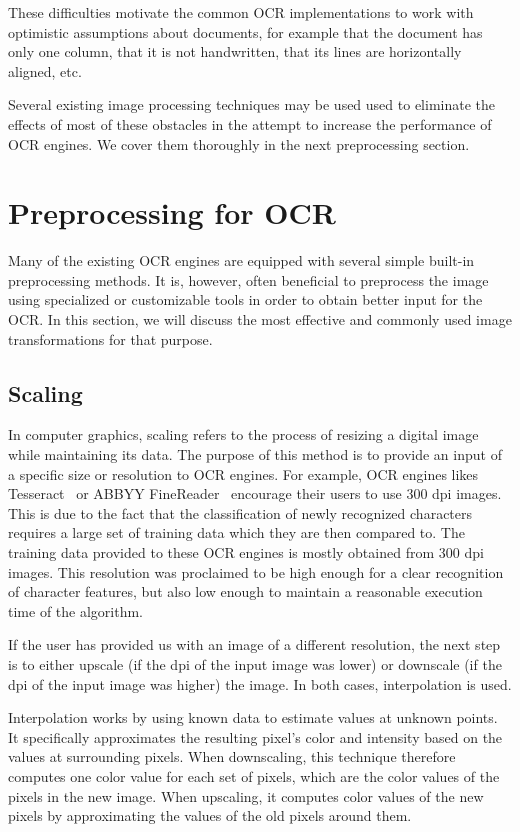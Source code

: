 These difficulties motivate the common OCR implementations to work with optimistic assumptions about documents, for example that the document has only one column, that it is not handwritten, that its lines are horizontally aligned, etc.

Several existing image processing techniques may be used used to eliminate the effects of most of
these obstacles in the attempt to increase the performance of OCR engines. We cover them thoroughly in the next preprocessing section.

\section{Preprocessing for OCR}

Many of the existing OCR engines are equipped with several simple built-in preprocessing methods. It is, however, often beneficial to preprocess the image using specialized or customizable tools in order to obtain better input for the OCR. In this section, we will discuss the most effective and commonly used image transformations for that purpose.

\subsection{Scaling}

In computer graphics, scaling refers to the process of resizing a digital image while maintaining its data. The purpose of this method is to provide an input of a specific size or resolution to OCR engines. For example, OCR engines likes Tesseract~\cite{TesseractQual} or ABBYY FineReader~\cite{ABBYYdpi} encourage their users to use 300 dpi images. This is due to the fact that the classification of newly recognized characters requires a large set of training data which they are then compared to. The training data provided to these OCR engines is mostly obtained from 300 dpi images. This resolution was proclaimed to be high enough for a clear recognition of character features, but also low enough to maintain a reasonable execution time of the algorithm. 

If the user has provided us with an image of a different resolution, the next step is to either upscale (if the dpi of the input image was lower) or downscale (if the dpi of the input image was higher) the image. In both cases, interpolation is used. 

Interpolation works by using known data to estimate values at unknown points. It specifically approximates the resulting pixel's color and intensity based on the values at surrounding pixels. When downscaling, this technique therefore computes one color value for each set of pixels, which are the color values of the pixels in the new image. When upscaling, it computes color values of the new pixels by approximating the values of the old pixels around them.

